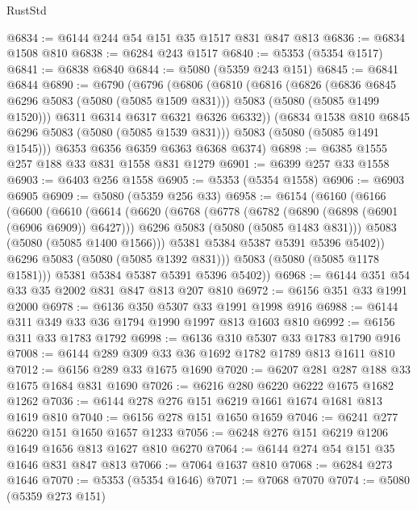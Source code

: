 \begin{lexlean}{RustStd}
\begin{coremodule}
{\begin{coremodule}
{{{{{@6834 := @6144 @244 @54 @151 @35 @1517 @831 @847 @813
@6836 := @6834 @1508 @810
@6838 := @6284 @243 @1517
@6840 := @5353 (@5354 @1517)
@6841 := @6838 @6840
@6844 := @5080 (@5359 @243 @151)
@6845 := @6841 @6844
@6890 := @6790
    (@6796
      (@6806
        (@6810
          (@6816
            (@6826
              (@6836 @6845 @6296 @5083 (@5080 (@5085 @1509 @831)))
              @5083
              (@5080 (@5085 @1499 @1520)))
            @6311
            @6314
            @6317
            @6321
            @6326
            @6332))
        (@6834 @1538 @810 @6845 @6296 @5083 (@5080 (@5085 @1539 @831)))
        @5083
        (@5080 (@5085 @1491 @1545)))
      @6353
      @6356
      @6359
      @6363
      @6368
      @6374)
@6898 := @6385 @1555 @257 @188 @33 @831 @1558 @831 @1279
@6901 := @6399 @257 @33 @1558
@6903 := @6403 @256 @1558
@6905 := @5353 (@5354 @1558)
@6906 := @6903 @6905
@6909 := @5080 (@5359 @256 @33)
@6958 := @6154
    (@6160
      (@6166
        (@6600
          (@6610
            (@6614
              (@6620
                (@6768
                  (@6778
                    (@6782 (@6890 (@6898 (@6901 (@6906 @6909)) @6427)))
                    @6296
                    @5083
                    (@5080 (@5085 @1483 @831)))
                  @5083
                  (@5080 (@5085 @1400 @1566)))
                @5381
                @5384
                @5387
                @5391
                @5396
                @5402))
            @6296
            @5083
            (@5080 (@5085 @1392 @831)))
          @5083
          (@5080 (@5085 @1178 @1581)))
        @5381
        @5384
        @5387
        @5391
        @5396
        @5402))
@6968 := @6144 @351 @54 @33 @35 @2002 @831 @847 @813 @207 @810
@6972 := @6156 @351 @33 @1991 @2000
@6978 := @6136 @350 @5307 @33 @1991 @1998 @916
@6988 := @6144 @311 @349 @33 @36 @1794 @1990 @1997 @813 @1603 @810
@6992 := @6156 @311 @33 @1783 @1792
@6998 := @6136 @310 @5307 @33 @1783 @1790 @916
@7008 := @6144 @289 @309 @33 @36 @1692 @1782 @1789 @813 @1611 @810
@7012 := @6156 @289 @33 @1675 @1690
@7020 := @6207 @281 @287 @188 @33 @1675 @1684 @831 @1690
@7026 := @6216 @280 @6220 @6222 @1675 @1682 @1262
@7036 := @6144 @278 @276 @151 @6219 @1661 @1674 @1681 @813 @1619 @810
@7040 := @6156 @278 @151 @1650 @1659
@7046 := @6241 @277 @6220 @151 @1650 @1657 @1233
@7056 := @6248 @276 @151 @6219 @1206 @1649 @1656 @813 @1627 @810 @6270
@7064 := @6144 @274 @54 @151 @35 @1646 @831 @847 @813
@7066 := @7064 @1637 @810
@7068 := @6284 @273 @1646
@7070 := @5353 (@5354 @1646)
@7071 := @7068 @7070
@7074 := @5080 (@5359 @273 @151)
}}}}}
\end{coremodule}}
\end{coremodule}
\end{lexlean}
